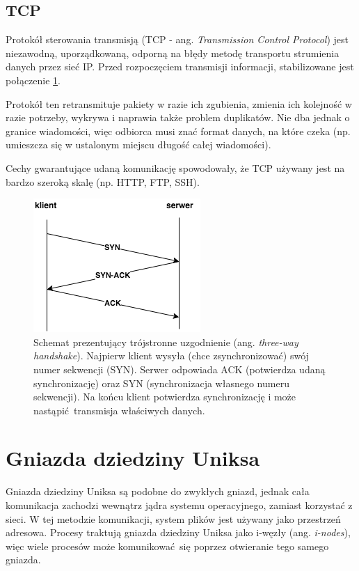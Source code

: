 \subsection{TCP}

Protokół sterowania transmisją (TCP - ang. \textit{Transmission Control Protocol}) jest niezawodną, uporządkowaną, odporną na błędy metodę transportu strumienia danych przez sieć IP. Przed rozpoczęciem transmisji informacji, stabilizowane jest połączenie \ref{fig:TCP_handshake}.

Protokół ten retransmituje pakiety w razie ich zgubienia, zmienia ich kolejność w razie potrzeby, wykrywa i naprawia także problem duplikatów. Nie dba jednak o granice wiadomości, więc odbiorca musi znać format danych, na które czeka (np. umieszcza się w ustalonym miejscu długość całej wiadomości).

Cechy gwarantujące udaną komunikację spowodowały, że TCP używany jest na bardzo szeroką skalę (np. HTTP, FTP, SSH).

\begin{figure}[h]
	\centering
	\includegraphics{img/TCP_handshake.png}
	\caption{Schemat prezentujący trójstronne uzgodnienie (ang. \textit{three-way handshake}). Najpierw klient wysyła (chce zsynchronizować) swój numer sekwencji (SYN). Serwer odpowiada ACK (potwierdza udaną synchronizację) oraz SYN (synchronizacja własnego numeru sekwencji). Na końcu klient potwierdza synchronizację i może nastąpić transmisja właściwych danych.}
	\label{fig:TCP_handshake}
\end{figure}
%


\section{Gniazda dziedziny Uniksa}

Gniazda dziedziny Uniksa są podobne do zwykłych gniazd, jednak cała komunikacja zachodzi wewnątrz jądra systemu operacyjnego, zamiast korzystać z sieci. W tej metodzie komunikacji, system plików jest używany jako przestrzeń adresowa. Procesy traktują gniazda dziedziny Uniksa jako i-węzły (ang. \textit{i-nodes}), więc wiele procesów może komunikować się poprzez otwieranie tego samego gniazda.


